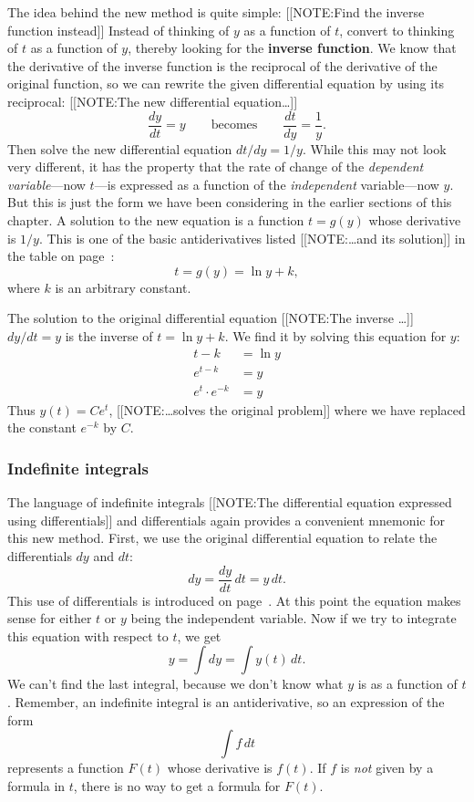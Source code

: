 The idea behind the new method is quite simple:  
[[NOTE:Find the inverse function instead]]
Instead of thinking of $y$ as a function of $t$, convert to thinking
of $t$ as a function of $y$, thereby looking for the {\bf inverse
  function}.  We know that the derivative of the inverse function is
the reciprocal of the derivative of the original function, so we can
rewrite the given differential equation by using its reciprocal:
[[NOTE:The new differential equation\ldots]]
	\[
\dfrac{dy}{dt} = y \qquad \mbox{becomes} \qquad 
		\dfrac{dt}{dy} = \dfrac{1}{y}.
\]
Then solve the new differential equation $dt/dy = 1/y$.  While this
may not look very different, it has the property that the rate of
change of the {\em dependent variable}---now $t$---is expressed as a
function of the {\em independent} variable---now $y$.  But this is
just the form we have been considering in the earlier sections of this
chapter.  A solution to the new equation is a function $t = g(y)$
whose derivative is $1/y$.  This is one of the basic antiderivatives
listed 
[[NOTE:\ldots and its solution]]
in the table on page~\pageref{table}:
	\[
t = g(y) = \ln{y} + k,
\]
where $k$ is an arbitrary constant.  

The solution to the original differential equation 
[[NOTE:The inverse \ldots]]	
$dy/dt = y$ is the inverse of $t = \ln{y} + k$.  We find it by solving
this equation for $y$:
\begin{align*}
t - k &= \ln{y} \\
e^{t - k} &= y \\
e^t \cdot e^{-k} &= y
\end{align*}
Thus $y(t) = Ce^t$, 
[[NOTE:\ldots solves the  original problem]]
where we have replaced the constant $e^{-k}$ by $C$.


\subsubsection{Indefinite integrals}
\label{subsubsec:indefinite-integrals}

The language of indefinite integrals 
[[NOTE:The differential equation expressed using differentials]]
and differentials again provides a convenient mnemonic for this new
method.  First, we use the original differential equation to relate
the differentials $dy$ and $dt$:
	\[
dy = \dfrac{dy}{dt} \, dt = y \, dt.
\]
This use of differentials is introduced on
page~\pageref{differentials}.  At this point the equation makes sense
for either $t$ or $y$ being the independent variable.  Now if we try
to integrate this equation with respect to $t$, we get
	\[
y = \int dy = \int y(t) \, dt.
\]
We can't find the last integral, because we don't know what $y$ is as
a function of $t$.  Remember, an indefinite integral is an
antiderivative, so an expression of the form
	\[
\int f \, dt
\]
represents a function $F(t)$ whose derivative is $f(t)$.  If $f$ is
{\em not\/} given by a formula in $t$, there is no way to get a
formula for $F(t)$.

